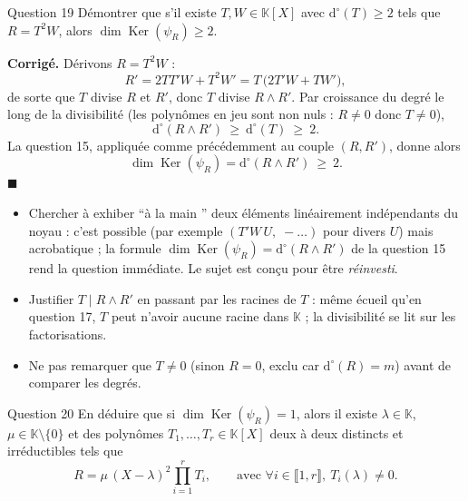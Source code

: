 \documentclass[11pt,a4paper]{article}
\newenvironment{corrige}
  {\par\medskip\noindent
   \begin{tcolorbox}[blanker, breakable,
     borderline west={2.5pt}{0pt}{vertP},
     left=10pt, top=2pt, bottom=2pt]
   {\color{vertP}\bfseries Corrigé.}\hspace{0.5em}\ignorespaces}
  {\hfill$\blacksquare$\end{tcolorbox}\medskip}
\newcommand{\og}{``}
\newcommand{\fg}{''}
\newcommand{\K}{\mathbb{K}}
\newcommand{\ii}[2]{\llbracket #1,#2\rrbracket}
\newcommand{\dg}[1]{\mathrm{d}^{\circ}\!\left(#1\right)}
\DeclareMathOperator{\Ker}{Ker}
\begin{document}
\begin{enonce}{Question 19}
Démontrer que s'il existe $T,W\in\K[X]$ avec $\dg{T}\ge 2$ tels que
$R=T^{2}W$, alors $\dim\Ker(\psi_R)\ge 2$.
\end{enonce}

\begin{corrige}
Dérivons $R=T^{2}W$ :
\[
R'=2TT'W+T^{2}W'=T\,\big(2T'W+TW'\big),
\]
de sorte que $T$ divise $R$ et $R'$, donc $T$ divise $R\wedge R'$.
Par croissance du degré le long de la divisibilité (les polynômes en
jeu sont non nuls : $R\neq 0$ donc $T\neq 0$),
\[
\dg{R\wedge R'}\ \ge\ \dg{T}\ \ge\ 2 .
\]
La question 15, appliquée comme précédemment au couple $(R,R')$,
donne alors
\[
\dim\Ker(\psi_R)=\dg{R\wedge R'}\ \ge\ 2 .
\]
\end{corrige}

\begin{pieges}
\begin{itemize}[leftmargin=1.4em, itemsep=2pt]
\item Chercher à exhiber \og à la main \fg{} deux éléments
linéairement indépendants du noyau : c'est possible (par exemple
$(T'W\,U,\;-\ldots)$ pour divers $U$) mais acrobatique ; la formule
$\dim\Ker(\psi_R)=\dg{R\wedge R'}$ de la question 15 rend la
question immédiate. Le sujet est conçu pour être \emph{réinvesti}.
\item Justifier $T\mid R\wedge R'$ en passant par les racines de $T$ :
même écueil qu'en question 17, $T$ peut n'avoir aucune racine dans
$\K$ ; la divisibilité se lit sur les factorisations.
\item Ne pas remarquer que $T\neq 0$ (sinon $R=0$, exclu car
$\dg{R}=m$) avant de comparer les degrés.
\end{itemize}
\end{pieges}

\begin{enonce}{Question 20}
En déduire que si $\dim\Ker(\psi_R)=1$, alors il existe
$\lambda\in\K$, $\mu\in\K\setminus\{0\}$ et des polynômes
$T_1,\dots,T_r\in\K[X]$ deux à deux distincts et irréductibles tels
que
\[
R=\mu\,(X-\lambda)^{2}\prod_{i=1}^{r}T_i,
\qquad\text{avec }\forall i\in\ii{1}{r},\ T_i(\lambda)\neq 0 .
\]
\end{enonce}
\end{document}
